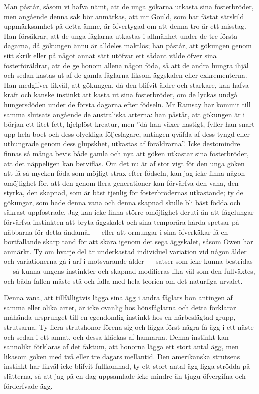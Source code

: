 Man påstår, såsom vi hafva nämt, att de unga gökarna utkasta sina fosterbröder, men angående denna sak bör anmärkas, att mr Gould, som har fästat särskild uppmärksamhet på detta ämne, är öfvertygad om att denna tro är ett misstag. Han försäkrar, att de unga fåglarna utkastas i allmänhet under de tre första dagarna, då gökungen ännu är alldeles maktlös; han påstår, att gökungen genom sitt skrik eller på något annat sätt utöfvar ett sådant välde öfver sina fosterföräldrar, att de ge honom allena någon föda, så att de andra hungra ihjäl och sedan kastas ut af de gamla fåglarna liksom äggskalen eller exkrementerna. Han medgifver likväl, att gökungen, då den blifvit äldre och starkare, kan hafva kraft och kanske instinkt att kasta ut sina fosterbröder, om de lyckas undgå hungersdöden under de första dagarna efter födseln. Mr Ramsay har kommit till samma slutsats angående de australiska arterna: han påstår, att gökungen är i början ett litet fett, hjelplöst kreatur, men ”då han växer hastigt, fyller han snart upp hela boet och dess olyckliga följeslagare, antingen qväfda af dess tyngd eller uthungrade genom dess glupskhet, utkastas af föräldrarna”. Icke destomindre finnas så många bevis både gamla och nya att göken utkastar sina fosterbröder, att det näppeligen kan betviflas. Om det nu är af stor vigt för den unga göken att få så mycken föda som möjligt strax efter födseln, kan jag icke finna någon omöjlighet för, att den genom flera generationer kan förvärfva den vana, den styrka, den skapnad, som är bäst tjenlig för fosterbrödernas utkastande; ty de gökungar, som hade denna vana och denna skapnad skulle bli bäst födda och säkrast uppfostrade. Jag kan icke finna större omöjlighet deruti än att fågelungar förvärfva instinkten att bryta äggskalet och sina temporära hårda spetsar på näbbarna för detta ändamål — eller att ormungar i sina öfverkäkar få en bortfallande skarp tand för att skära igenom det sega äggskalet, såsom Owen har anmärkt. Ty om hvarje del är underkastad individuel variation vid någon ålder och variationerna gå i arf i motsvarande ålder — satser som icke kunna bestridas — så kunna ungens instinkter och skapnad modifieras lika väl som den fullväxtes, och båda fallen måste stå och falla med hela teorien om det naturliga urvalet.

Denna vana, att tillfälligtvis lägga sina ägg i andra fåglars bon antingen af samma eller olika arter, är icke ovanlig hos hönsfåglarna och detta förklarar måhända ursprunget till en egendomlig instinkt hos en närbeslägtad grupp, strutsarna. Ty flera strutshonor förena sig och lägga först några få ägg i ett näste och sedan i ett annat, och dessa kläckas af hannarna. Denna instinkt kan sannolikt förklaras af det faktum, att honorna lägga ett stort antal ägg, men likasom göken med två eller tre dagars mellantid. Den amerikanska strutsens instinkt har likväl icke blifvit fullkomnad, ty ett stort antal ägg ligga strödda på slätterna, så att jag på en dag uppsamlade icke mindre än tjugu öfvergifna och förderfvade ägg.

